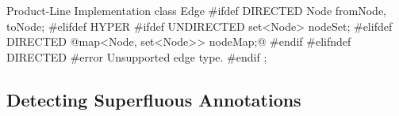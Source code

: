 \begin{frame}[fragile]{\myframetitle}
\begin{mycolumns}[columns=3,widths={40,23,37},animation=none]
\begin{cpptight}[basicstyle=\small]{Product-Line Implementation}
class Edge {
#ifdef DIRECTED
	Node fromNode, toNode;
#elifdef HYPER
#ifdef UNDIRECTED
	set<Node> nodeSet;
#elifdef DIRECTED
	@map<Node, set<Node>> nodeMap;@
#endif
#elifndef DIRECTED
#error Unsupported edge type.
#endif
};
		\end{cpptight}
	\end{mycolumns}
\end{frame}


\subsection{Detecting Superfluous Annotations}

\begin{frame}[fragile]{\myframetitle}
	\begin{mycolumns}[columns=3,widths={40,23,37},animation=none]
\end{mycolumns}
\end{frame}
